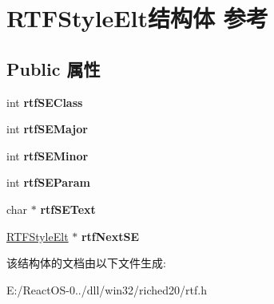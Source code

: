 \hypertarget{struct_r_t_f_style_elt}{}\section{R\+T\+F\+Style\+Elt结构体 参考}
\label{struct_r_t_f_style_elt}
\subsection*{Public 属性}
\begin{DoxyCompactItemize}
\item 
\mbox{\label{struct_r_t_f_style_elt_aaa170a90f06d7e9a7100c2ca82e06e31}} 
int {\bfseries rtf\+S\+E\+Class}
\item 
\mbox{\label{struct_r_t_f_style_elt_ad7783ab181b32504a72300c0314fa9f4}} 
int {\bfseries rtf\+S\+E\+Major}
\item 
\mbox{\label{struct_r_t_f_style_elt_a35c6938d470bc60e4cf100d8646c3868}} 
int {\bfseries rtf\+S\+E\+Minor}
\item 
\mbox{\label{struct_r_t_f_style_elt_a523b0bdba3fe8be8b5c801318ae8cfff}} 
int {\bfseries rtf\+S\+E\+Param}
\item 
\mbox{\label{struct_r_t_f_style_elt_a498847c4b9c8d3bd98c00349b4669490}} 
char $\ast$ {\bfseries rtf\+S\+E\+Text}
\item 
\mbox{\label{struct_r_t_f_style_elt_a6fc6d40cb2b28d6b0e426052dfbdce14}} 
\hyperlink{struct_r_t_f_style_elt}{R\+T\+F\+Style\+Elt} $\ast$ {\bfseries rtf\+Next\+SE}
\end{DoxyCompactItemize}


该结构体的文档由以下文件生成\+:\begin{DoxyCompactItemize}
\item 
E\+:/\+React\+O\+S-\/0../dll/win32/riched20/rtf.\+h\end{DoxyCompactItemize}
